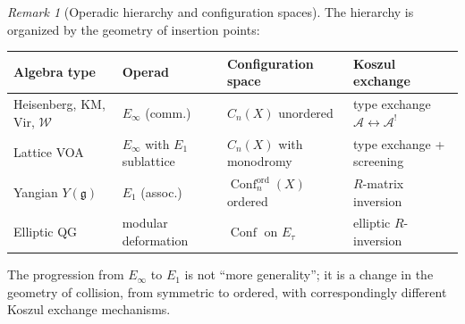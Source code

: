 \documentclass[11pt]{report}
\theoremstyle{definition}
\theoremstyle{remark}
\newtheorem{remark}[theorem]{Remark}
\providecommand{\cA}{\mathcal{A}}
\providecommand{\fg}{\mathfrak{g}}
\providecommand{\Eone}{E_1}
\providecommand{\Einf}{E_\infty}
\numberwithin{equation}{section}
\begin{document}
\begin{remark}[Operadic hierarchy and configuration spaces]
\label{rem:operadic-hierarchy-table}
The hierarchy is organized by the geometry of insertion points:
\begin{center}
\small
\begin{tabular}{llll}
\textbf{Algebra type} & \textbf{Operad} &
 \textbf{Configuration space} & \textbf{Koszul exchange} \\ \hline
Heisenberg, KM, Vir, $\mathcal{W}$
 & $\Einf$ (comm.)
 & $C_n(X)$ unordered
 & type exchange $\cA \leftrightarrow \cA^!$ \\[2pt]
Lattice VOA
 & $\Einf$ with $\Eone$ sublattice
 & $C_n(X)$ with monodromy
 & type exchange + screening \\[2pt]
Yangian $Y(\fg)$
 & $\Eone$ (assoc.)
 & $\operatorname{Conf}_n^{\mathrm{ord}}(X)$ ordered
 & $R$-matrix inversion \\[2pt]
Elliptic QG
 & modular deformation
 & $\operatorname{Conf}$ on $E_\tau$
 & elliptic $R$-inversion
\end{tabular}
\end{center}
The progression from $\Einf$ to $\Eone$ is not ``more
generality''; it is a change in the geometry of collision, from
symmetric to ordered, with correspondingly different Koszul
exchange mechanisms.
\end{remark}
\end{document}
